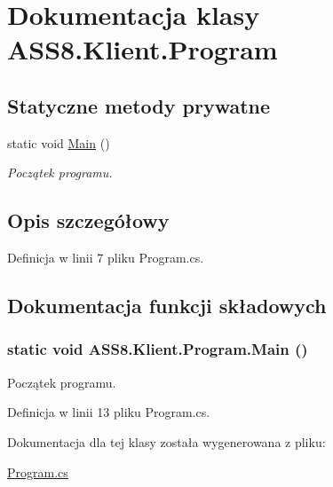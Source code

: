 \hypertarget{a00021}{
\section{Dokumentacja klasy ASS8.Klient.Program}
\label{de/d11/a00021}
}
\subsection*{Statyczne metody prywatne}
\begin{CompactItemize}
\item 
static void \hyperlink{a00021_c9edff683ea959d93a3274f584eda626}{Main} ()
\begin{CompactList}\small\item\em Początek programu. \item\end{CompactList}\end{CompactItemize}


\subsection{Opis szczegółowy}


Definicja w linii 7 pliku Program.cs.

\subsection{Dokumentacja funkcji składowych}
\hypertarget{a00021_c9edff683ea959d93a3274f584eda626}{
\subsubsection[{Main}]{\setlength{\rightskip}{0pt plus 5cm}static void ASS8.Klient.Program.Main ()}}
\label{de/d11/a00021_c9edff683ea959d93a3274f584eda626}


Początek programu. 



Definicja w linii 13 pliku Program.cs.

Dokumentacja dla tej klasy została wygenerowana z pliku:\begin{CompactItemize}
\item 
\hyperlink{a00050}{Program.cs}\end{CompactItemize}
